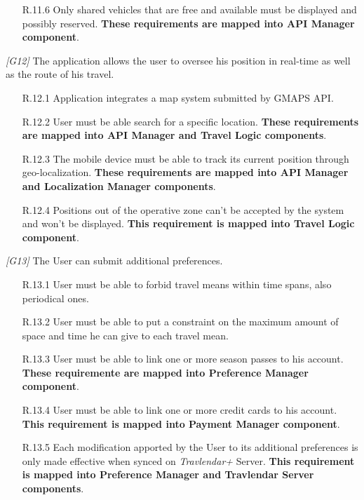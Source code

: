\begin{description}
\begin{itemize}
			\item[R.11.6] Only shared vehicles that are free and available must be displayed and possibly reserved.
			\textbf{These requirements are mapped into API Manager component}.
		\end{itemize}


	\vskip0.75cm
	\item \textit{[G12]} The application allows the user to oversee his position in real-time as well as the route of his travel.
		\begin{itemize}
			\item [R.12.1] Application integrates a map system submitted by GMAPS API.

			\item [R.12.2] User must be able search for a specific location.
			\textbf{These requirements are mapped into API Manager and Travel Logic components}.

			\item [R.12.3] The mobile device must be able to track its current position through geo-localization.
			\textbf{These requirements are mapped into API Manager and Localization Manager components}.

			\item [R.12.4] Positions out of the operative zone can't be accepted by the system and won't be displayed.			
			\textbf{This requirement is mapped into Travel Logic component}.

		\end{itemize}


	\vskip0.75cm
	\item \textit{[G13]} The User can submit additional preferences.
		\begin{itemize}
			\item[R.13.1] User must be able to forbid travel means within time spans, also periodical ones.

			\item[R.13.2] User must be able to put a constraint on the maximum amount of space and time he can give to each travel mean.

			\item[R.13.3] User must be able to link one or more season passes to his account.
			\textbf{These requiremente are mapped into Preference Manager component}.
			
			\item[R.13.4] User must be able to link one or more credit cards to his account.
			\textbf{This requirement is mapped into Payment Manager component}.

			\item[R.13.5] Each modification apported by the User to its additional preferences is only made effective when synced on \textit{Travlendar+} Server.
			\textbf{This requirement is mapped into Preference Manager and Travlendar Server components}.
		\end{itemize}
\end{description}